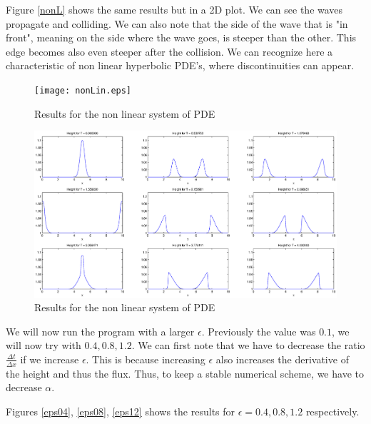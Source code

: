 Figure \ref{nonL} shows the same results but in a 2D plot. We can see the waves propagate and colliding. We can also note that the side of the wave that is "in front", meaning on the side where the wave goes, is steeper than the other. This edge becomes also even steeper after the collision. We can recognize here a characteristic of non linear hyperbolic PDE's, where discontinuities can appear.

\begin{figure}
\begin{center}
\texttt{[image: nonLin.eps]}
\caption{Results for the non linear system of PDE}
\label{nonLin}
\end{center}
\end{figure}

\begin{figure}
\begin{center}
\includegraphics[scale=0.4]{nonL.eps}
\caption{Results for the non linear system of PDE}
\label{nonLin}
\end{center}
\end{figure}


We will now run the program with a larger $\epsilon$. Previously the value was $0.1$, we will now try with $0.4,0.8,1.2$. We can first note that we have to decrease the ratio $\frac{\Delta t}{\Delta x}$ if we increase $\epsilon$. This is because increasing $\epsilon$ also increases the derivative of the height and thus the flux. Thus, to keep a stable numerical scheme, we have to decrease $\alpha$.

Figures \ref{eps04}, \ref{eps08}, \ref{eps12} shows the results for $\epsilon = 0.4,0.8,1.2$ respectively.

